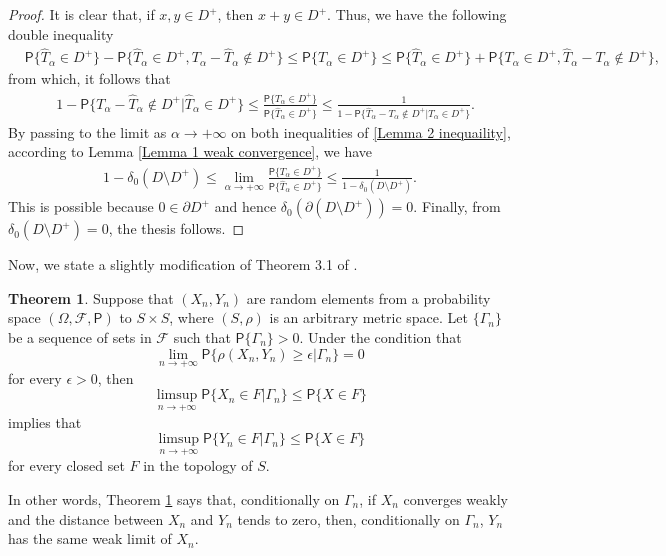 \documentclass{article}
\theoremstyle{definition}
\newtheorem{theorem}{Theorem}[section]
\numberwithin{equation}{section}
\begin{document}
\begin{proof}
It is clear that, if $x,y \in D^+$, then $x+y \in D^+$. Thus, we have the following double inequality
\begin{align*}
&\mathsf{P}\{\hat{T}_\alpha \in D^+\} -\mathsf{P}\{\hat{T}_\alpha \in D^+,T_\alpha- \hat{T}_\alpha \notin D^+\} \leq \mathsf{P}\{T_\alpha \in D^+\} 
\leq \mathsf{P}\{\hat{T}_\alpha \in D^+\} + \mathsf{P}\{T_\alpha \in D^+,\hat{T}_\alpha- T_\alpha \notin D^+\},
\end{align*}
from which, it follows that
\begin{align}\label{Lemma 2 inequaility}
&1- \mathsf{P}\{T_\alpha- \hat{T}_\alpha \notin D^+|\hat{T}_\alpha \in D^+\} \leq \frac{\mathsf{P}\{T_\alpha \in D^+\}}{\mathsf{P}\{\hat{T}_\alpha \in D^+\}} \leq \frac{1}{1-\mathsf{P}\{\hat{T}_\alpha- T_\alpha \notin D^+|T_\alpha \in D^+\}}.
\end{align}
By passing to the limit as $\alpha \to +\infty$ on both inequalities of \eqref{Lemma 2 inequaility}, according to Lemma \ref{Lemma 1 weak convergence}, we have
\begin{align*}
1- \delta_0(D\setminus D^+) \leq \lim_{\alpha \to +\infty}\frac{\mathsf{P}\{T_\alpha \in D^+\}}{\mathsf{P}\{\hat{T}_\alpha \in D^+\}} \leq \frac{1}{1-\delta_0(D\setminus D^+)}.
\end{align*}
This is possible because $0 \in \partial D^+$ and hence $\delta_0(\partial(D\setminus D^+)) = 0$. Finally, from $\delta_0(D\setminus D^+) = 0$, the thesis follows.
\end{proof}
Now, we state a slightly modification of Theorem 3.1 of \cite{Billingsley}.
\begin{theorem}\label{Conditional version Billingsley}
Suppose that $(X_n,Y_n)$ are random elements from a probability space $(\Omega,\mathcal{F},\mathsf{P})$ to $S\times S$, where $(S,\rho)$ is an arbitrary metric space. Let $\{\Gamma_n\}$ be a sequence of sets in $\mathcal{F}$ such that $\mathsf{P}\{\Gamma_n\}>0$. Under the condition that
\begin{equation}
\lim_{n \to +\infty}\mathsf{P}\{\rho(X_n,Y_n) \geq \epsilon|\Gamma_n\} = 0
\end{equation}
for every $\epsilon>0$, then
\begin{equation}
\limsup_{n \to +\infty}\mathsf{P}\{X_n \in F |\Gamma_n\} \leq \mathsf{P}\{X \in F\}
\end{equation} 
implies that
\begin{equation}
\limsup_{n\to+\infty}\mathsf{P}\{Y_n \in F|\Gamma_n\} \leq \mathsf{P}\{X \in F\}
\end{equation}
for every closed set $F$ in the topology of $S$.
\end{theorem}
In other words, Theorem \ref{Conditional version Billingsley} says that, conditionally on $\Gamma_n$, if $X_n$ converges weakly and the distance between $X_n$ and $Y_n$ tends to zero, then, conditionally on $\Gamma_n$, $Y_n$ has the same weak limit of $X_n$. 
\end{document}
